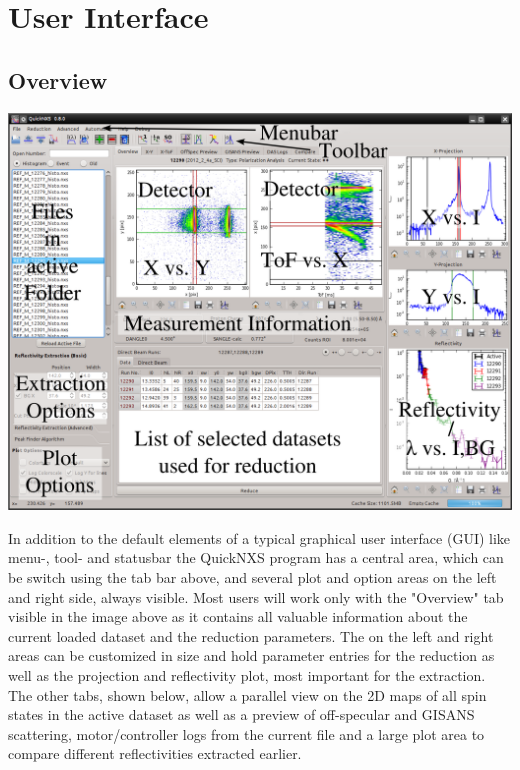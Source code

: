 \chapter{User Interface}
\label{chap:user_interface}

\section{Overview}
\def\svgwidth{\textwidth}
\begin{LARGE}
\includegraphics[width=455pt]{screenshots/overview_labels.png} 
\end{LARGE}

In addition to the default elements of a typical graphical user interface (GUI) like menu-, tool- and statusbar the QuickNXS program has a central area, which can be switch using the tab bar above, and several plot and option areas on the left and right side, always visible. Most users will work only with the "Overview" tab visible in the image above as it contains all valuable information about the current loaded dataset and the reduction parameters. 
The on the left and right areas can be customized in size and hold parameter entries for the reduction as well as the projection and reflectivity plot, most important for the extraction.
The other tabs, shown below, allow a parallel view on the 2D maps of all spin states in the active dataset as well as a preview of off-specular and GISANS scattering, motor/controller logs from the current file and a large plot area to compare different reflectivities extracted earlier.

